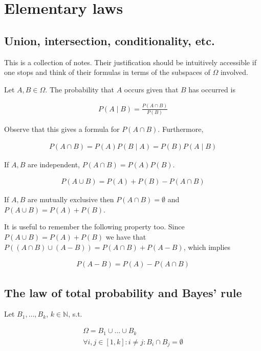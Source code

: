 \documentclass[a4paper, 12pt]{article}
\begin{document}
\section{Elementary laws}

\subsection{Union, intersection, conditionality, etc.}

This is a collection of notes. Their justification should be intuitively
accessible if one stops and think of their formulas in terms of the subspaces of
$\Omega$ involved.

Let $A, B \in \Omega$. The probability that $A$ occurs given that $B$ has
occurred is 

\begin{align*}
    P(A \mid B) = \frac{P (A \cap B)}{P(B)}
\end{align*}    

Observe that this gives a formula for $P(A \cap B)$. Furthermore, 

\begin{align*}
    P(A \cap B) = P(A)P(B \mid A) = P(B)P(A \mid B)
\end{align*}

If $A, B$ are independent, $P(A \cap B) = P(A)P(B)$.

\begin{align*}
    P(A \cup B) = P(A) + P(B) - P(A \cap B)
\end{align*}

If $A, B$ are mutually exclusive then $P(A \cap B) = \emptyset$ and $P(A \cup B)
= P(A) + P(B)$.

It is useful to remember the following property too. Since $P(A \cup B) = P(A) +
P(B)$ we have that $P((A \cap B) \cup (A - B)) = P(A \cap B) + P(A - B)$, which
implies 

\begin{align*}
    P(A - B) = P(A) - P(A \cap B)
\end{align*}

\subsection{The law of total probability and Bayes' rule}

Let $B_1, \ldots, B_k$, $k \in \mathbb{N}$, s.t. 

\begin{align*}
    \Omega = B_1 \cup \ldots \cup B_k \\ 
    \forall i, j \in [1, k] : i \neq j : B_i \cap  B_j = \emptyset
\end{align*}
\end{document}
